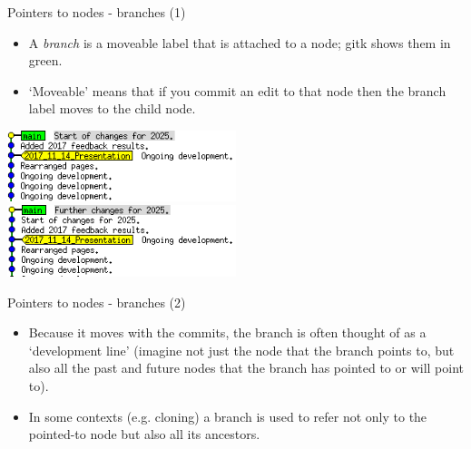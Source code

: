 \documentclass[usenames,dvipsnames]{beamer}
\begin{document}
\begin{frame}{Pointers to nodes - branches (1)}
  \begin{block}{}
    \begin{itemize}
      \item{A \textit{branch} is a moveable label that is attached to a node; gitk shows them in green.}
      \item{`Moveable' means that if you commit an edit to that node then the branch label moves to the child node.}
    \end{itemize}
    \vspace{5mm}
    \begin{center}
      \includegraphics[width=0.5\textwidth]{Branch_1.png}%
      \includegraphics[width=0.5\textwidth]{Branch_2.png}
    \end{center}
  \end{block}
\end{frame}
  
\begin{frame}{Pointers to nodes - branches (2)}
  \begin{block}{}
    \begin{itemize}
      \item{Because it moves with the commits, the branch is often thought of as a `development line' (imagine not just the node that the branch points to, but also all the past and future nodes that the branch has pointed to or will point to).}
      \item{In some contexts (e.g. cloning) a branch is used to refer not only to the pointed-to node but also all its ancestors.}
    \end{itemize}
  \end{block}
\end{frame}
\end{document}

